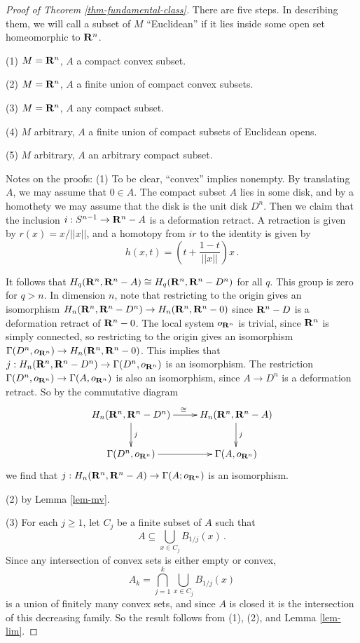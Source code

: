 \begin{proof}[Proof of Theorem \ref{thm-fundamental-class}] 
There are five steps. In describing them, we will call a subset of $M$
``Euclidean'' if it lies inside some open set homeomorphic to $\mathbf R^n$.

\smallskip
\noindent
(1) $M=\mathbf R^n$, $A$ a compact convex subset.

\noindent
(2) $M=\mathbf R^n$, $A$ a finite union of compact convex subsets.

\noindent
(3) $M=\mathbf R^n$, $A$ any compact subset.

\noindent
(4) $M$ arbitrary, $A$ a finite union of compact subsets of Euclidean opens.

\noindent
(5) $M$ arbitrary, $A$ an arbitrary compact subset. 

\smallskip
Notes on the proofs: (1) To be clear, ``convex'' implies nonempty. 
By translating $A$, we may assume that $0\in A$. The compact subset $A$
lies in some disk, and by a homothety we may assume that the disk is the
unit disk $D^n$. Then we claim that the inclusion $i:S^{n-1}\to\mathbf R^n-A$
is a deformation retract. A retraction is given by $r(x)=x/||x||$, 
and a homotopy from $ir$ to the identity is given by 
\[
h(x,t)=\left(t+\frac{1-t}{||x||}\right)x\,.
\]

It follows that $H_q(\mathbf R^n,\mathbf R^n-A)\cong H_q(\mathbf R^n,\mathbf R^n-D^n)$ for all
$q$. This group is zero for $q>n$. In dimension $n$, note that restricting
to the origin gives an isomorphism 
$H_n(\mathbf R^n,\mathbf R^n-D^n)\to H_n(\mathbf R^n,\mathbf R^n-0)$ since 
$\mathbf R^n-D$ is a deformation retract of $\mathbf R^n-0$. The local system $o_{\mathbf R^n}$ 
is trivial, since $\mathbf R^n$ is simply connected, so restricting to the origin
gives an isomorphism $\Gamma(D^n,o_{\mathbf R^n})\to H_n(\mathbf R^n,\mathbf R^n-0)$. 
This implies that $j:H_n(\mathbf R^n,\mathbf R^n-D^n)\to\Gamma(D^n,o_{\mathbf R^n})$
is an isomorphism. The restriction 
$\Gamma(D^n,o_{\mathbf R^n})\to\Gamma(A,o_{\mathbf R^n})$ is also an isomorphism, since
$A\to D^n$ is a deformation retract. So by the commutative diagram
\[
\xymatrix{
H_n(\RR^n,\RR^n-D^n) \ar[r]^\cong \ar[d]^j & H_n(\RR^n,\RR^n-A) \ar[d]^j \\
\Gamma(D^n,o_{\RR^n}) \ar[r] & \Gamma(A,o_{\RR^n}) 
}\]
we find that $j:H_n(\mathbf R^n,\mathbf R^n-A)\to\Gamma(A;o_{\mathbf R^n})$ is an isomorphism.

(2) by Lemma \ref{lem-mv}. 

(3) For each $j\geq1$, let $C_j$ be a finite subset of $A$ such that 
\[
A\subseteq \bigcup_{x\in C_j}B_{1/j}(x)\,.
\]
Since any intersection of convex sets is either empty or convex, 
\[
A_k=\bigcap_{j=1}^k\bigcup_{x\in C_j}B_{1/j}(x)
\]
is a union of finitely many convex sets, and since $A$ is closed
it is the intersection of this decreasing family. So the result
follows from (1), (2), and Lemma \ref{lem-lim}.


\end{proof}
